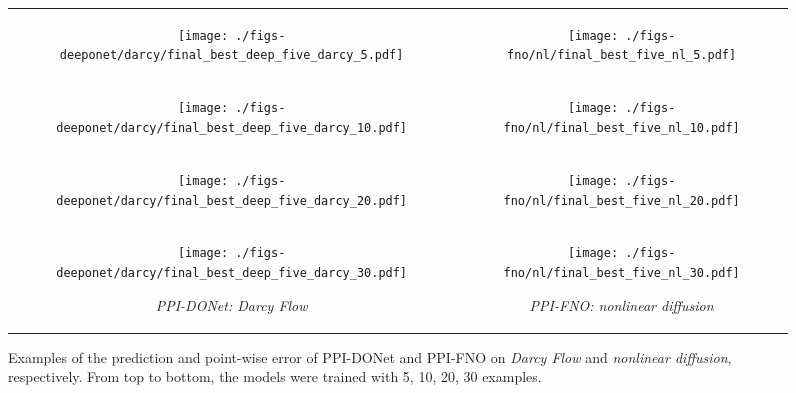\begin{figure*}
	\centering
	\setlength\tabcolsep{0pt}
	\begin{tabular}[c]{cc}
	\begin{subfigure}[b]{0.48\textwidth}
		\centering
	\texttt{[image: ./figs-deeponet/darcy/final\_best\_deep\_five\_darcy\_5.pdf]}
	\end{subfigure} &
    \begin{subfigure}[b]{0.48\textwidth}
		\centering
	\texttt{[image: ./figs-fno/nl/final\_best\_five\_nl\_5.pdf]}
	\end{subfigure}
 \\
	\begin{subfigure}[b]{0.48\textwidth}
		\centering
		\texttt{[image: ./figs-deeponet/darcy/final\_best\_deep\_five\_darcy\_10.pdf]}
	\end{subfigure} &
 \begin{subfigure}[b]{0.48\textwidth}
		\centering
	\texttt{[image: ./figs-fno/nl/final\_best\_five\_nl\_10.pdf]}
	\end{subfigure}
 \\
 \begin{subfigure}[b]{0.48\textwidth}
		\centering
		\texttt{[image: ./figs-deeponet/darcy/final\_best\_deep\_five\_darcy\_20.pdf]}
	\end{subfigure} &
 \begin{subfigure}[b]{0.48\textwidth}
		\centering
	\texttt{[image: ./figs-fno/nl/final\_best\_five\_nl\_20.pdf]}
	\end{subfigure}
 \\
 \begin{subfigure}[b]{0.48\textwidth}
		\centering
	\texttt{[image: ./figs-deeponet/darcy/final\_best\_deep\_five\_darcy\_30.pdf]}
 \caption{\small \textit{PPI-DONet: Darcy Flow}}\label{fig:darcy-dont-example}
	\end{subfigure} & 
 \begin{subfigure}[b]{0.48\textwidth}
		\centering
	\texttt{[image: ./figs-fno/nl/final\_best\_five\_nl\_30.pdf]}
 \caption{\small \textit{PPI-FNO: nonlinear diffusion}}\label{fig:nl-fno-example}
	\end{subfigure}
\end{tabular}
	\caption{\small Examples of the prediction and point-wise error of PPI-DONet and PPI-FNO on \textit{Darcy Flow} and \textit{nonlinear diffusion}, respectively.  From top to bottom, the models were trained with 5, 10, 20, 30 examples.}
\end{figure*}

